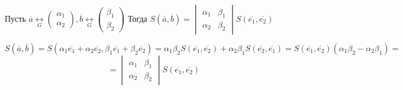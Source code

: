 \begin{statement}
Пусть $\overline{a} \underset{G}{\longleftrightarrow} \begin{pmatrix}\alpha_1 \\ \alpha_2 \end{pmatrix}, \overline{b} \underset{G}{\longleftrightarrow} \begin{pmatrix}\beta_1 \\ \beta_2 \end{pmatrix}$
Тогда $S(\overline{a}, \overline{b}) = \begin{vmatrix}\alpha_1 & \beta_1 \\ \alpha_2 & \beta_2 \end{vmatrix} S(\overline{e_1}, \overline{e_2})$
\end{statement}

\[
  S(\overline{a}, \overline{b}) = S(\alpha_1 \overline{e_1} + \alpha_2 \overline{e_2}, \beta_1 \overline{e_1} + \beta_2 \overline{e_2}) = \alpha_1\beta_2 S(\overline{e_1}, \overline{e_2}) + \alpha_2\beta_1 S(\overline{e_2}, \overline{e_1}) = S(\overline{e_1}, \overline{e_2}) (\alpha_1 \beta_2 - \alpha_2 \beta_1) = 
\]  
\[
= \begin{vmatrix}\alpha_1 & \beta_1 \\ \alpha_2 & \beta_2 \end{vmatrix} S(\overline{e_1}, \overline{e_2})
\] 
